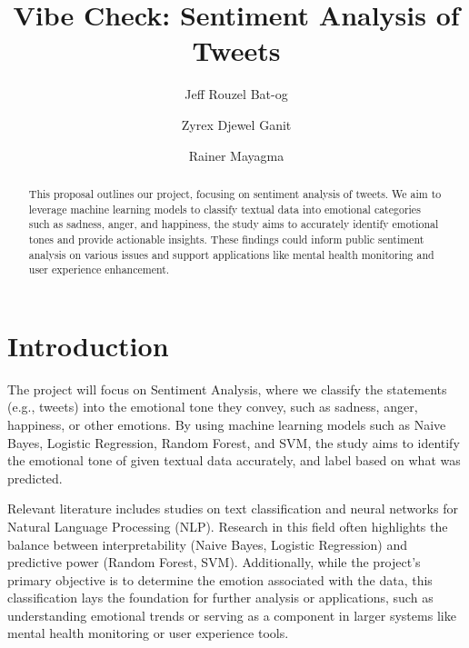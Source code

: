 \documentclass[runningheads]{llncs}
\begin{document}
\title{Vibe Check: Sentiment Analysis of Tweets}
\author{Jeff Rouzel Bat-og \and Zyrex Djewel Ganit \and Rainer Mayagma}

\maketitle

\begin{abstract}
This proposal outlines our project, focusing on sentiment analysis of tweets. We aim to leverage machine learning models to classify textual data into emotional categories such as sadness, anger, and happiness, the study aims to accurately identify emotional tones and provide actionable insights. These findings could inform public sentiment analysis on various issues and support applications like mental health monitoring and user experience enhancement.
\end{abstract}


\section{Introduction}
The project will focus on Sentiment Analysis, where we classify the statements (e.g., tweets) into the emotional tone they convey, such as sadness, anger, happiness, or other emotions. By using machine learning models such as Naive Bayes, Logistic Regression, Random Forest, and SVM, the study aims to identify the emotional tone of given textual data accurately, and label based on what was predicted.

Relevant literature includes studies on text classification and neural networks for Natural Language Processing (NLP). Research in this field often highlights the balance between interpretability (Naive Bayes, Logistic Regression) and predictive power (Random Forest, SVM). Additionally, while the project’s primary objective is to determine the emotion associated with the data, this classification lays the foundation for further analysis or applications, such as understanding emotional trends or serving as a component in larger systems like mental health monitoring or user experience tools.
\end{document}
